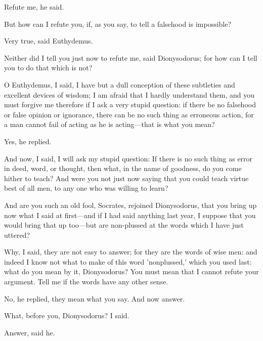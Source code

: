 \documentclass[11pt,letter]{article}
\begin{document}
\par  Refute me, he said.

\par  But how can I refute you, if, as you say, to tell a falsehood is impossible?

\par  Very true, said Euthydemus.

\par  Neither did I tell you just now to refute me, said Dionysodorus; for how can I tell you to do that which is not?

\par  O Euthydemus, I said, I have but a dull conception of these subtleties and excellent devices of wisdom; I am afraid that I hardly understand them, and you must forgive me therefore if I ask a very stupid question: if there be no falsehood or false opinion or ignorance, there can be no such thing as erroneous action, for a man cannot fail of acting as he is acting—that is what you mean?

\par  Yes, he replied.

\par  And now, I said, I will ask my stupid question: If there is no such thing as error in deed, word, or thought, then what, in the name of goodness, do you come hither to teach? And were you not just now saying that you could teach virtue best of all men, to any one who was willing to learn?

\par  And are you such an old fool, Socrates, rejoined Dionysodorus, that you bring up now what I said at first—and if I had said anything last year, I suppose that you would bring that up too—but are non-plussed at the words which I have just uttered?

\par  Why, I said, they are not easy to answer; for they are the words of wise men: and indeed I know not what to make of this word 'nonplussed,' which you used last: what do you mean by it, Dionysodorus? You must mean that I cannot refute your argument. Tell me if the words have any other sense.

\par  No, he replied, they mean what you say. And now answer.

\par  What, before you, Dionysodorus? I said.

\par  Answer, said he.
\end{document}
